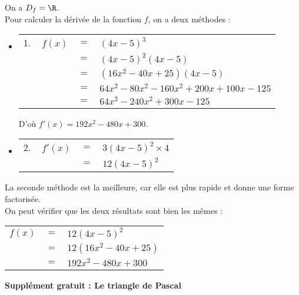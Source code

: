 \vspace*{.3cm}

On a $D_f = \R$. \\

Pour calculer la dérivée de la fonction $f$, on a deux méthodes : 

\begin{itemize}
\item[] 
\begin{tabular}{rll}
1. $ \; \; \; f(x)$ & $=$ & $\left(4x - 5\right)^3$ \\
& $=$ & $\left(4x-5\right)^2 \left(4x - 5\right)$ \\
& $=$ & $\left(16x^2 - 40x + 25\right)\left(4x-5\right)$ \\
& $=$ & $64x^2 - 80x^2 - 160x^2 + 200x + 100x - 125$ \\
& $=$ & $64x^2 - 240x^2 + 300x - 125$ \\
\end{tabular}

\vspace*{.3cm}

D'où $f'(x) = 192x^2 - 480x + 300$. \\
\item[] 
\begin{tabular}{rll}
2. $\; \; \; f'(x)$ & $=$ & $3\left(4x-5\right)^2 \times 4$ \\
& $=$ & $12\left(4x-5\right)^2$ \\
\end{tabular}
\end{itemize}

\vspace*{.3cm}

La seconde méthode est la meilleure, car elle est plus rapide et donne une forme factorisée. \\

On peut vérifier que les deux résultats sont bien les mêmes : \\

\begin{tabular}{rll}
$f(x)$ & $=$ & $12\left(4x-5\right)^2$ \\
& $=$ & $12\left(16x^2 - 40x + 25\right)$ \\
& $=$ & $192x^2 - 480x + 300$ \\
\end{tabular}

\vspace*{.3cm}

\textbf{Supplément gratuit : Le triangle de Pascal} \\

